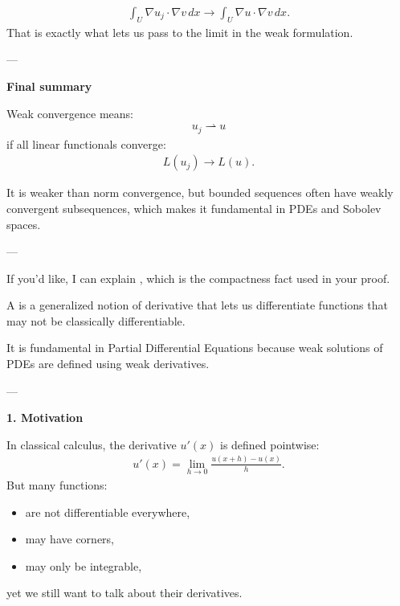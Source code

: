 \documentclass[12pt,a4paper]{report}
\begin{document}
\begin{description}
\begin{description}
\begin{align*}
\int_U \nabla u_j\cdot\nabla v\,dx
\to
\int_U \nabla u\cdot\nabla v\,dx.
\end{align*}
That is exactly what lets us pass to the limit in the weak formulation.

---

\item \textbf{Final summary}

Weak convergence means:
\begin{align*}
u_j\rightharpoonup u
\end{align*}
if all linear functionals converge:
\begin{align*}
L(u_j)\to L(u).
\end{align*}

It is weaker than norm convergence, but bounded sequences often have weakly convergent subsequences, which makes it fundamental in PDEs and Sobolev spaces.

---
\end{description}

If you'd like, I can explain , which is the compactness fact used in your proof.

\HLINE

	\newpage
	\item {}

A  is a generalized notion of derivative that lets us differentiate functions that may not be classically differentiable.

It is fundamental in Partial Differential Equations because weak solutions of PDEs are defined using weak derivatives.

---
\begin{description}

\item \textbf{1. Motivation}

In classical calculus, the derivative $u'(x)$ is defined pointwise:
\begin{align*}
u'(x)=\lim_{h\to 0}\frac{u(x+h)-u(x)}{h}.
\end{align*}
But many functions:
\begin{itemize}
\item are not differentiable everywhere,
\item may have corners,
\item may only be integrable,
\end{itemize}
yet we still want to talk about their derivatives.


\end{description}
\end{description}
\end{document}
